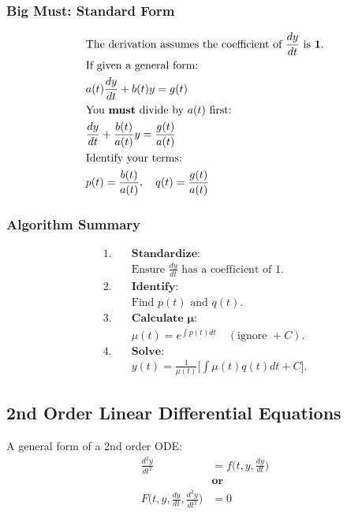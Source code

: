 \documentclass[11pt]{article}
\begin{document}
\subsubsection*{Big Must: Standard Form}
\begin{align*}
    &\text{The derivation assumes the coefficient of } \frac{dy}{dt} \text{ is } \mathbf{1}. \\
    &\text{If given a general form:} \\
    &a(t)\frac{dy}{dt} + b(t)y = g(t) \\
    &\text{You \textbf{must} divide by } a(t) \text{ first:} \\
    &\frac{dy}{dt} + \frac{b(t)}{a(t)}y = \frac{g(t)}{a(t)} \\
    &\text{Identify your terms:} \\
    &p(t) = \frac{b(t)}{a(t)}, \quad q(t) = \frac{g(t)}{a(t)}
\end{align*}

\subsubsection*{Algorithm Summary}
\begin{align*}
    1. \quad &\textbf{Standardize:} \\
    &\text{Ensure } \frac{dy}{dt} \text{ has a coefficient of 1.} \\
    2. \quad &\textbf{Identify:} \\
    &\text{Find } p(t) \text{ and } q(t). \\
    3. \quad &\textbf{Calculate } \boldsymbol{\mu}: \\
    &\mu(t) = e^{\int p(t)dt} \quad (\text{ignore } +C). \\
    4. \quad &\textbf{Solve:} \\
    &y(t) = \frac{1}{\mu(t)} \Bigg[ \int \mu(t)q(t) dt + C \Bigg].
\end{align*}

\clearpage
\subsection{2nd Order Linear Differential Equations}
A general form of a 2nd order ODE:
\begin{align*}
    \frac{d^2y}{dt^2}&= f\Bigg(t,y,\frac{dy}{dt}\Bigg)\\
    &\textbf{or}\\
    F\Bigg(t,y,\frac{dy}{dt},\frac{d^2y}{dt^2}\Bigg)&=0
\end{align*}
\end{document}
